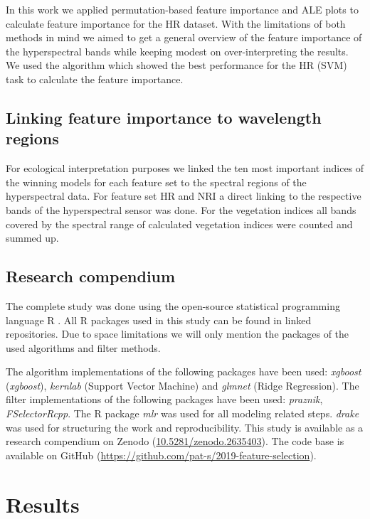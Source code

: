 \documentclass[letterpaper, peerreview]{IEEEtran}
\begin{document}
In this work we applied permutation-based feature importance and \ac{ALE} plots to calculate feature importance for the HR dataset.
With the limitations of both methods in mind we aimed to get a general overview of the feature importance of the hyperspectral bands while keeping modest on over-interpreting the results.
We used the algorithm which showed the best performance for the HR (SVM) task to calculate the feature importance.

\subsection{Linking feature importance to wavelength regions}

\noindent For ecological interpretation purposes we linked the ten most important indices of the winning models for each feature set to the spectral regions of the hyperspectral data.
For feature set HR and NRI a direct linking to the respective bands of the hyperspectral sensor was done.
For the vegetation indices all bands covered by the spectral range of calculated vegetation indices were counted and summed up.

\subsection{Research compendium}

\noindent The complete study was done using the open-source statistical programming language R \cite{rcoreteam2019}.
All R packages used in this study can be found in linked repositories.
Due to space limitations we will only mention the packages of the used algorithms and filter methods.

The algorithm implementations of the following packages have been used: \textit{xgboost}\cite{chen2016} (\textit{xgboost}), \textit{kernlab}\cite{kernlab} (Support Vector Machine) and \textit{glmnet}\cite{glmnet} (Ridge Regression).
The filter implementations of the following packages have been used: \textit{praznik\cite{praznik}}, \textit{FSelectorRcpp}\cite{fselectorrcpp}.
The R package \textit{mlr} \cite{mlr} was used for all modeling related steps.
\textit{drake} \cite{drake} was used for structuring the work and reproducibility.
This study is available as a research compendium on Zenodo (\url{10.5281/zenodo.2635403}).
The code base is available on GitHub (\url{https://github.com/pat-s/2019-feature-selection}).

\section{Results}
\end{document}
